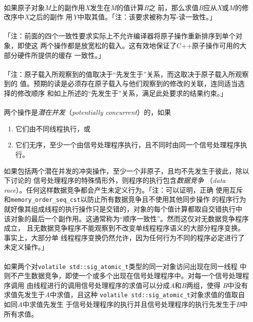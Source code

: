 \paragraph{}
如果原子对象\textit{M}上的副作用\textit{X}发生在\textit{M}的值计算\textit{B}之
前，那么求值\textit{B}应从\textit{X}或\textit{M}的修改序中\textit{X}之后的副作
用\textit{Y}中取其值。「注：该要求被称为写-读一致性。」

\paragraph{}
「注：前面的四个一致性要求实际上不允许编译器将原子操作重新排序到单个对象，即使这
两个操作都是放宽松的载入。这有效地保证了C++原子操作可用的大部分硬件所提供的缓存
一致性。」

\paragraph{}
「注：原子载入所观察到的值取决于``先发生于''关系，而这取决于原子载入所观察到的
值。预期的读是必须存在原子载入与他们观察到的修改的关联，连同适当选择的修改顺序
和如上所述的``先发生于''关系，满足此处要求的结果约束。」

\paragraph{}
两个操作是\textit{潜在并发}（\textit{potentially concurrent}）的，如果
\begin{enumerate}
  \item{它们由不同线程执行，或}
  \item{它们无序，至少一个由信号处理程序执行，且不同时由同一个信号处理程序执行。}
\end{enumerate}
如果包括两个潜在并发的冲突操作，至少一个非原子，且均不先发生于彼此，除以下讨论的
信号处理程序的特殊情形外，则程序的执行包含\textit{数据竞争}
（\textit{data race}）。任何这样数据竞争都会产生未定义行为。「注：可以证明，正确
使用互斥和\texttt{memory\_order\_seq\_cst}以防止所有数据竞争且不使用其他同步操作
的程序行为就好像其组成线程的执行操作只是交错的，对象的每个值计算都取自交错执行中
该对象的最后一个副作用。这通常称为``顺序一致性''。然而这仅对无数据竞争程序成立，
且无数据竞争程序不能观察到不改变单线程程序语义的大部分程序变换。事实上，大部分单
线程程序变换仍然允许，因为任何行为不同的程序必定进行了未定义操作。」

\paragraph{}
如果两个对\texttt{volatile std::sig\_atomic\_t}类型的同一对象访问出现在同一线程
中则不产生数据竞争，即使一个或多个出现在信号处理程序中。对每一个信号处理程序调用
由线程进行的调用信号处理程序的求值可以分成\textit{A}和\textit{B}两组，使得
\textit{B}中没有求值先发生于\textit{A}中求值，且这种
\texttt{volatile std::sig\_atomic\_t}对象求值的值取自如同\textit{A}中求值先发生
于信号处理程序的执行并且信号处理程序的执行先发生于\textit{B}中所有求值。

